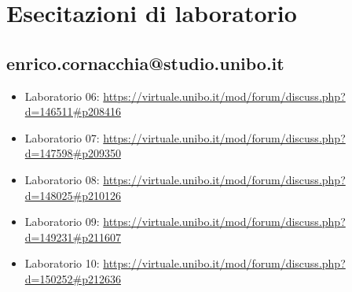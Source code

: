 \documentclass[a4paper,12pt]{report}
\begin{document}
\chapter{Esecitazioni di laboratorio} 

\section{enrico.cornacchia@studio.unibo.it}

\begin{itemize}
 \item Laboratorio 06: \url{https://virtuale.unibo.it/mod/forum/discuss.php?d=146511#p208416}
 \item Laboratorio 07: \url{https://virtuale.unibo.it/mod/forum/discuss.php?d=147598#p209350}
 \item Laboratorio 08: \url{https://virtuale.unibo.it/mod/forum/discuss.php?d=148025#p210126}
 \item Laboratorio 09: \url{https://virtuale.unibo.it/mod/forum/discuss.php?d=149231#p211607}
 \item Laboratorio 10: \url{https://virtuale.unibo.it/mod/forum/discuss.php?d=150252#p212636}
\end{itemize}
\end{document}
